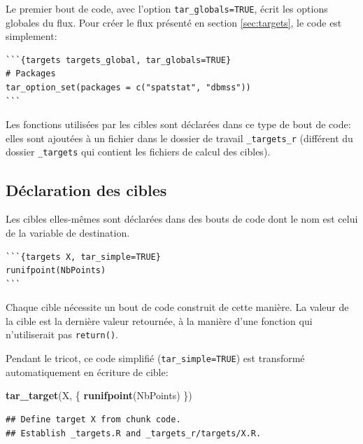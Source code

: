 \documentclass[
  12pt,
  french,
  a4paper,
  extrafontsizes,onecolumn,openright
  ]{memoir}
\newenvironment{Shaded}{\begin{snugshade}}{\end{snugshade}}
\newcommand{\KeywordTok}[1]{\textcolor[rgb]{0.13,0.29,0.53}{\textbf{#1}}}
\newcommand{\NormalTok}[1]{#1}
\begin{document}
\normalsize

Le premier bout de code, avec l'option \texttt{tar\_globals=TRUE}, écrit les options globales du flux.
Pour créer le flux présenté en section \ref{sec:targets}, le code est simplement:

\begin{verbatim}
```{targets targets_global, tar_globals=TRUE}
# Packages
tar_option_set(packages = c("spatstat", "dbmss"))
```
\end{verbatim}

Les fonctions utilisées par les cibles sont déclarées dans ce type de bout de code: elles sont ajoutées à un fichier dans le dossier de travail \texttt{\_targets\_r} (différent du dossier \texttt{\_targets} qui contient les fichiers de calcul des cibles).

\hypertarget{duxe9claration-des-cibles}{%
\subsection{Déclaration des cibles}\label{duxe9claration-des-cibles}}

Les cibles elles-mêmes sont déclarées dans des bouts de code dont le nom est celui de la variable de destination.

\begin{verbatim}
```{targets X, tar_simple=TRUE}
runifpoint(NbPoints)
```
\end{verbatim}

Chaque cible nécessite un bout de code construit de cette manière.
La valeur de la cible est la dernière valeur retournée, à la manière d'une fonction qui n'utiliserait pas \texttt{return()}.

Pendant le tricot, ce code simplifié (\texttt{tar\_simple=TRUE}) est transformé automatiquement en écriture de cible:

\scriptsize

\begin{Shaded}
\begin{Highlighting}[]
\KeywordTok{tar_target}\NormalTok{(X, \{}
  \KeywordTok{runifpoint}\NormalTok{(NbPoints)}
\NormalTok{\})}
\end{Highlighting}
\end{Shaded}

\begin{verbatim}
## Define target X from chunk code.
## Establish _targets.R and _targets_r/targets/X.R.
\end{verbatim}

\normalsize
\end{document}
